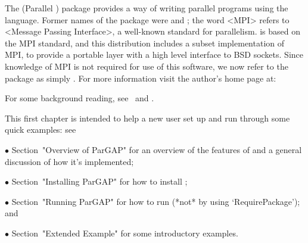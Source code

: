 
\hfuzz=5pt %
\overfullrule=0pt %


The {\ParGAP}  (Parallel  {\GAP})  package  provides  a  way  of  writing
parallel programs using the {\GAP} language. Former names of the  package
were  and ; the word <MPI> refers to
<Message Passing  Interface>,  a  well-known  standard  for  parallelism.
{\ParGAP} is based on the MPI standard, and this distribution includes  a
subset implementation of MPI, to provide a portable  layer  with  a  high
level interface to BSD sockets. Since knowledge of MPI  is  not  required
for use of  this  software,  we  now  refer  to  the  package  as  simply
{\ParGAP}. For more information visit the author's  {\ParGAP}  home  page
at:

For some background reading, see~\cite{Coo95} and \cite{Coo97}.

This first chapter is intended to help a new user set  up  {\ParGAP}  and
run through some quick examples: see

\beginlist%

\item{$\bullet$}
Section~"Overview of ParGAP" for an overview of the features of {\ParGAP}
and a general discussion of how it's implemented;

\item{$\bullet$}
Section~"Installing ParGAP" for how to install {\ParGAP};

\item{$\bullet$}
Section~"Running ParGAP"  for  how  to  run  {\ParGAP}  (*not*  by  using
`RequirePackage'); and

\item{$\bullet$}
Section~"Extended Example"  for  some introductory {\ParGAP} examples.

